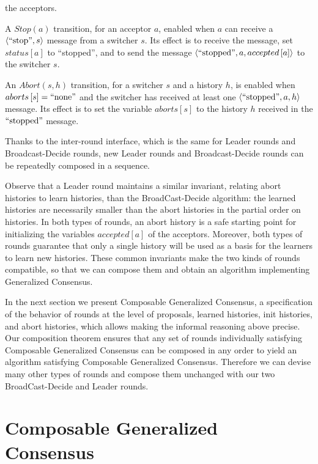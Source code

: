 \documentclass{llncs}
\begin{document}
\begin{compactitem}
  the acceptors. 
\item A $Stop\left( a \right)$ transition, for an acceptor $a$,
  enabled when $a$ can receive a $\left\langle\text{``stop''},s\right\rangle$ message
  from a switcher $s$. Its effect is to receive the message, set
  $status\left[ a \right]$ to ``stopped'', and to send the
  message $\left\langle\text{``stopped''},a,accepted\left[ a \right]\right\rangle$ to the
  switcher $s$. 
\item An $Abort\left( s, h \right)$ transition, for a switcher $s$ and a history $h$, is enabled when $aborts\left[ s \right] = \text{``none''}$ and
  the switcher has received at least one $\left\langle\text{``stopped''}, a, h\right\rangle$ message. Its effect is to set the variable $aborts\left[ s \right]$ to the
  history $h$ received in the $\text{``stopped''}$ message.
\end{compactitem}

Thanks to the inter-round interface, which is the same for Leader rounds and Broadcast-Decide rounds, new Leader rounds and Broadcast-Decide rounds can be repeatedly composed in a sequence. 

Observe that a Leader round maintains a similar invariant, relating abort histories to learn histories, than the BroadCast-Decide algorithm:
the learned histories are necessarily smaller than the abort histories in the partial order on histories. In both types of rounds, an abort history is
a safe starting point for initializing the variables $accepted\left[ a \right]$ of the acceptors. Moreover, both types of rounds guarantee that only a
single history will be used as a basis for the learners to learn new histories. These common invariants make the two kinds of rounds compatible, so that we can compose them and obtain an algorithm implementing Generalized Consensus.

In the next section we present Composable Generalized Consensus, a specification of the behavior of rounds at the level of proposals, learned histories, init histories, and abort histories, which allows making the informal reasoning above precise.
Our composition theorem ensures that any set of rounds individually satisfying Composable Generalized Consensus can be composed in any order to yield an algorithm satisfying Composable Generalized Consensus. Therefore we can devise many other types of rounds and compose them unchanged with our two BroadCast-Decide and Leader rounds.

\section{Composable Generalized Consensus}
\label{sec:aca}
\end{document}
